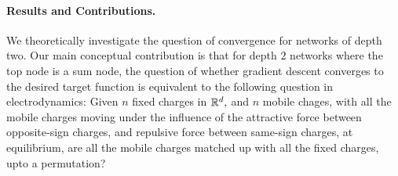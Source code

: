 


\paragraph{Results and Contributions.} 
We theoretically investigate the question of convergence for networks of depth two.
Our main conceptual contribution is that for depth $2$ networks where the top node is a sum node, the question of whether gradient descent converges to the desired target function is equivalent to the following question in electrodynamics: Given $n$ fixed charges in $\mathbb R^d,$ and $n$ mobile chages,
with all the mobile charges moving under the influence of the 
attractive force between opposite-sign charges, and repulsive force between  same-sign charges,
at equilibrium, are all the mobile charges matched up with all the fixed charges, upto a permutation? 

